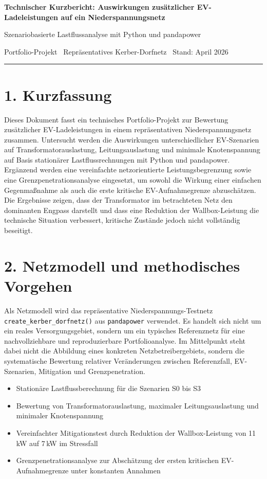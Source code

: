 \documentclass[10pt,a4paper]{article}
\newcommand{\reporttitle}{Technischer Kurzbericht: Auswirkungen zusätzlicher EV-Ladeleistungen auf ein Niederspannungsnetz}
\newcommand{\reportsubtitle}{Szenariobasierte Lastflussanalyse mit Python und pandapower}
\begin{document}
	
	{\Large\bfseries \reporttitle \par}
	\vspace{0.15em}
	{\normalsize \reportsubtitle \par}
	\vspace{0.2em}
	{\small Portfolio-Projekt \textbar\ Repräsentatives Kerber-Dorfnetz \textbar\ Stand: April 2026 \par}
	
	\vspace{0.3em}
	\hrule
	\vspace{0.35em}
	
	\section*{1. Kurzfassung}
	
	Dieses Dokument fasst ein technisches Portfolio-Projekt zur Bewertung zusätzlicher EV-Ladeleistungen in einem repräsentativen Niederspannungsnetz zusammen. Untersucht werden die Auswirkungen unterschiedlicher EV-Szenarien auf Transformatorauslastung, Leitungsauslastung und minimale Knotenspannung auf Basis stationärer Lastflussrechnungen mit Python und pandapower. Ergänzend werden eine vereinfachte netzorientierte Leistungsbegrenzung sowie eine Grenzpenetrationsanalyse eingesetzt, um sowohl die Wirkung einer einfachen Gegenmaßnahme als auch die erste kritische EV-Aufnahmegrenze abzuschätzen. Die Ergebnisse zeigen, dass der Transformator im betrachteten Netz den dominanten Engpass darstellt und dass eine Reduktion der Wallbox-Leistung die technische Situation verbessert, kritische Zustände jedoch nicht vollständig beseitigt.
	
	\section*{2. Netzmodell und methodisches Vorgehen}
	
	Als Netzmodell wird das repräsentative Niederspannungs-Testnetz \texttt{create\_kerber\_dorfnetz()} aus \texttt{pandapower} verwendet. Es handelt sich nicht um ein reales Versorgungsgebiet, sondern um ein typisches Referenznetz für eine nachvollziehbare und reproduzierbare Portfolioanalyse. Im Mittelpunkt steht dabei nicht die Abbildung eines konkreten Netzbetreibergebiets, sondern die systematische Bewertung relativer Veränderungen zwischen Referenzfall, EV-Szenarien, Mitigation und Grenzpenetration.
	
	\begin{itemize}
		\item Stationäre Lastflussberechnung für die Szenarien S0 bis S3
		\item Bewertung von Transformatorauslastung, maximaler Leitungsauslastung und minimaler Knotenspannung
		\item Vereinfachter Mitigationstest durch Reduktion der Wallbox-Leistung von 11\,kW auf 7\,kW im Stressfall
		\item Grenzpenetrationsanalyse zur Abschätzung der ersten kritischen EV-Aufnahmegrenze unter konstanten Annahmen
	\end{itemize}
		
\end{document}
